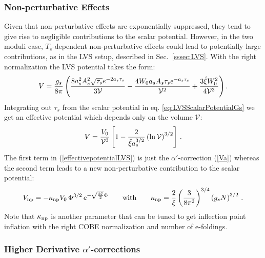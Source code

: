 \documentclass[12pt,a4paper]{book}
\newcommand\vo{{\mathcal{V}}}
\newcommand{\V}{{\cal{V}}}
\begin{document}
\subsubsection{Non-perturbative Effects}

Given that non-perturbative effects are exponentially suppressed, they tend to give rise to negligible contributions to the scalar potential. However, in the two moduli case, $T_s$-dependent non-perturbative effects could lead to potentially large contributions, as in the LVS setup, described in Sec.~\ref{sssec:LVS}. 
With the right normalization the LVS potential takes the form:
\begin{align}
V = \frac{g_s}{8 \pi} \left(\frac{8  a_s^2 A_s^2 \sqrt{\tau_s} e^{-2 a_s \tau_s}}{3 \V} - \frac{4 W_0 a_s A_s \tau_s e^{-a_s \tau_s}}{\V^2} + \frac{3 \hat{\xi} W_0^2}{4 \V^3}\right).
\label{eq:LVSScalarPotentialGs}
\end{align}
Integrating out $\tau_s$ from the scalar potential in eq. \eqref{eq:LVSScalarPotentialGs} we get an effective potential which depends only on the volume $\vo$:
\begin{align}
V = \frac{V_0}{\vo^3} \left[1 - \frac{2}{\hat\xi a_s^{3/2}} \left(\ln \V\right)^{3/2}\right]\,.
\label{effectivepotentialLVS}
\end{align}
The first term in (\ref{effectivepotentialLVS}) is just the $\alpha'$-correction (\ref{Va}) whereas the second term leads to a new non-perturbative contribution to the scalar potential:
\begin{align}
V_{\rm np} = - \kappa_{\rm np} V_0 \,\Phi^{3/2}\,e^{-\sqrt{\frac{27}{2}} \Phi} \qquad\text{with}\qquad 
\kappa_{\rm np}=\frac{2}{\xi}\left(\frac{3}{8\pi^2}\right)^{3/4}\left(g_s N\right)^{3/2}\,.
\label{Vnp}
\end{align}
Note that $\kappa_{\rm np}$ is another parameter that can be tuned to get inflection point inflation with the right COBE normalization and number of e-foldings.


\subsubsection{Higher Derivative $\alpha'$-corrections}
\label{sssec:HigherDerivativeAlphaCorrections}
\end{document}
